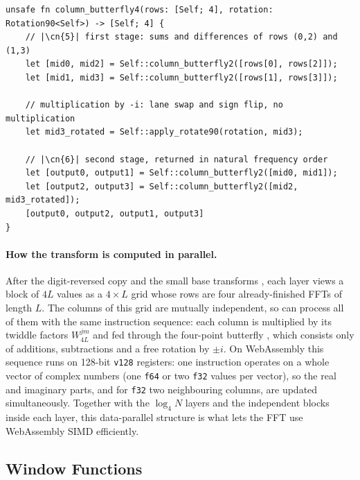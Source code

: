 \begin{lstlisting}[style=rustcode,
  caption={Four-point column butterfly on SIMD vectors (\texttt{f64} case).},
  label={lst:butterfly4}]
unsafe fn column_butterfly4(rows: [Self; 4], rotation: Rotation90<Self>) -> [Self; 4] {
    // |\cn{5}| first stage: sums and differences of rows (0,2) and (1,3)
    let [mid0, mid2] = Self::column_butterfly2([rows[0], rows[2]]);
    let [mid1, mid3] = Self::column_butterfly2([rows[1], rows[3]]);

    // multiplication by -i: lane swap and sign flip, no multiplication
    let mid3_rotated = Self::apply_rotate90(rotation, mid3);

    // |\cn{6}| second stage, returned in natural frequency order
    let [output0, output1] = Self::column_butterfly2([mid0, mid1]);
    let [output2, output3] = Self::column_butterfly2([mid2, mid3_rotated]);
    [output0, output2, output1, output3]
}
\end{lstlisting}

\paragraph{How the transform is computed in parallel.}
After the digit-reversed copy  and the small base transforms ,
each layer  views a block of $4L$ values as a $4 \times L$ grid whose
rows are four already-finished FFTs of length $L$. The columns of this grid
are mutually independent, so  can process all of them with the same
instruction sequence: each column is multiplied by its twiddle factors
$W_{4L}^{jm}$ and fed through the four-point butterfly , which
consists only of additions, subtractions and a free rotation by $\pm i$.
On WebAssembly this sequence runs on 128-bit \texttt{v128} registers: one
instruction operates on a whole vector of complex numbers (one \texttt{f64}
or two \texttt{f32} values per vector), so the real and imaginary parts, and
for \texttt{f32} two neighbouring columns, are updated simultaneously.
Together with the $\log_4 N$ layers and the independent blocks inside each
layer, this data-parallel structure is what lets the FFT use WebAssembly SIMD
efficiently.

\subsection{Window Functions}
\label{subsec:win-func}

